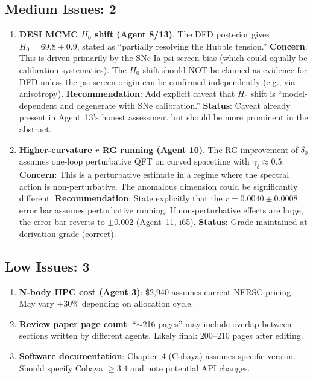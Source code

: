 \documentclass[11pt,a4paper]{article}
\begin{document}
\subsection{Medium Issues: 2}

\begin{enumerate}
\item \textbf{DESI MCMC $H_0$ shift (Agent 8/13)}. The DFD posterior gives $H_0 = 69.8 \pm 0.9$, stated as ``partially resolving the Hubble tension.'' \textbf{Concern}: This is driven primarily by the SNe Ia psi-screen bias (which could equally be calibration systematics). The $H_0$ shift should NOT be claimed as evidence for DFD unless the psi-screen origin can be confirmed independently (e.g., via anisotropy). \textbf{Recommendation}: Add explicit caveat that $H_0$ shift is ``model-dependent and degenerate with SNe calibration.'' \textbf{Status}: Caveat already present in Agent~13's honest assessment but should be more prominent in the abstract.

\item \textbf{Higher-curvature $r$ RG running (Agent 10)}. The RG improvement of $\delta_0$ assumes one-loop perturbative QFT on curved spacetime with $\gamma_\delta \approx 0.5$. \textbf{Concern}: This is a perturbative estimate in a regime where the spectral action is non-perturbative. The anomalous dimension could be significantly different. \textbf{Recommendation}: State explicitly that the $r = 0.0040 \pm 0.0008$ error bar assumes perturbative running. If non-perturbative effects are large, the error bar reverts to $\pm 0.002$ (Agent~11, i65). \textbf{Status}: Grade maintained at derivation-grade (correct).
\end{enumerate}

\subsection{Low Issues: 3}

\begin{enumerate}
\item \textbf{N-body HPC cost (Agent 3)}: \$2,940 assumes current NERSC pricing. May vary $\pm 30\%$ depending on allocation cycle.

\item \textbf{Review paper page count}: ``$\sim$216 pages'' may include overlap between sections written by different agents. Likely final: 200--210 pages after editing.

\item \textbf{Software documentation}: Chapter~4 (Cobaya) assumes specific version. Should specify Cobaya $\geq 3.4$ and note potential API changes.
\end{enumerate}
\end{document}
